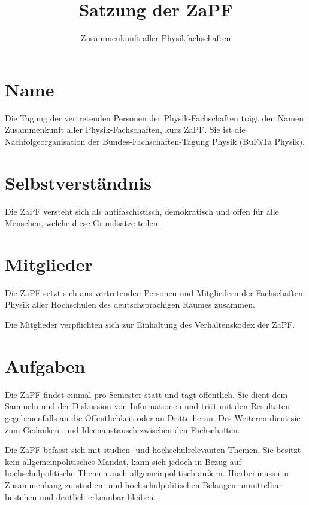\documentclass[
  a4paper,
  oneside]{scrartcl}
\title{Satzung der ZaPF}
\author{Zusammenkunft aller Physikfachschaften}
\date{}
\begin{document}
\maketitle

\section{Name}\label{name}

Die Tagung der vertretenden Personen der Physik-Fachschaften trägt den
Namen Zusammenkunft aller Physik-Fachschaften, kurz ZaPF. Sie ist die
Nachfolgeorganisation der Bundes-Fachschaften-Tagung Physik (BuFaTa
Physik).

\section{Selbstverständnis}\label{selbstverstuxe4ndnis}

Die ZaPF versteht sich als antifaschistisch, demokratisch und offen für
alle Menschen, welche diese Grundsätze teilen.

\section{Mitglieder}\label{mitglieder}

Die ZaPF setzt sich aus vertretenden Personen und Mitgliedern der
Fachschaften Physik aller Hochschulen des deutschsprachigen Raumes
zusammen.

Die Mitglieder verpflichten sich zur Einhaltung des Verhaltenskodex der
ZaPF.

\section{Aufgaben}\label{aufgaben}

Die ZaPF findet einmal pro Semester statt und tagt öffentlich. Sie dient
dem Sammeln und der Diskussion von Informationen und tritt mit den
Resultaten gegebenenfalls an die Öffentlichkeit oder an Dritte heran.
Des Weiteren dient sie zum Gedanken- und Ideenaustausch zwischen den
Fachschaften.

Die ZaPF befasst sich mit studien- und hochschulrelevanten Themen. Sie
besitzt kein allgemeinpolitisches Mandat, kann sich jedoch in Bezug auf
hochschulpolitische Themen auch allgemeinpolitisch äußern. Hierbei muss
ein Zusammenhang zu studien- und hochschulpolitischen Belangen
unmittelbar bestehen und deutlich erkennbar bleiben.
\end{document}
